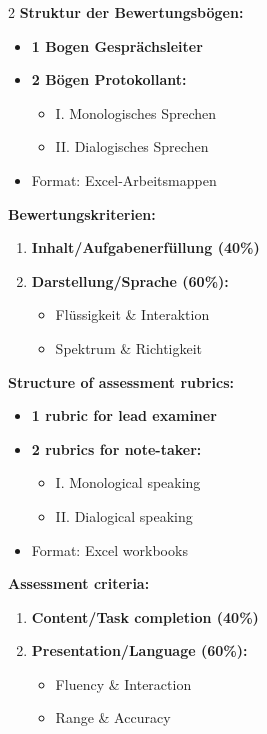 \documentclass[10pt,a4paper]{article}
\begin{document}
\begin{paracol}{2}
\small
\textbf{Struktur der Bewertungsbögen:}\footnotemark[12]
\begin{itemize}[noitemsep,topsep=2pt]
\item \textbf{1 Bogen Gesprächsleiter}
\item \textbf{2 Bögen Protokollant:}
\begin{itemize}[noitemsep,topsep=1pt]
\item[-] I. Monologisches Sprechen
\item[-] II. Dialogisches Sprechen
\end{itemize}
\item Format: Excel-Arbeitsmappen
\end{itemize}

\textbf{Bewertungskriterien:}
\begin{enumerate}[noitemsep,topsep=2pt]
\item \textbf{Inhalt/Aufgabenerfüllung (40\%)}
\item \textbf{Darstellung/Sprache (60\%):}
\begin{itemize}[noitemsep,topsep=1pt]
\item[-] Flüssigkeit \& Interaktion
\item[-] Spektrum \& Richtigkeit
\end{itemize}
\end{enumerate}

\switchcolumn

\small\color{english}
\textbf{Structure of assessment rubrics:}\footnotemark[12]
\begin{itemize}[noitemsep,topsep=2pt]
\item \textbf{1 rubric for lead examiner}
\item \textbf{2 rubrics for note-taker:}
\begin{itemize}[noitemsep,topsep=1pt]
\item[-] I. Monological speaking
\item[-] II. Dialogical speaking
\end{itemize}
\item Format: Excel workbooks
\end{itemize}

\textbf{Assessment criteria:}
\begin{enumerate}[noitemsep,topsep=2pt]
\item \textbf{Content/Task completion (40\%)}
\item \textbf{Presentation/Language (60\%):}
\begin{itemize}[noitemsep,topsep=1pt]
\item[-] Fluency \& Interaction
\item[-] Range \& Accuracy
\end{itemize}
\end{enumerate}

\end{paracol}
\end{document}
